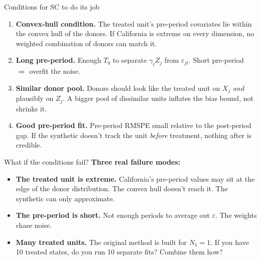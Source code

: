 \documentclass[aspectratio=169,11pt]{beamer}
\begin{document}
\begin{frame}{Conditions for SC to do its job}
\vspace{0.2cm}
\begin{enumerate}\small\setlength\itemsep{1pt}
  \item \textbf{Convex-hull condition.} \;The treated unit's pre-period covariates lie within the convex hull of the donors. \;If California is extreme on every dimension, no weighted combination of donors can match it.
  \vspace{0.2em}
  \item \textbf{Long pre-period.} \;Enough $T_0$ to separate $\gamma_t Z_j$ from $\varepsilon_{jt}$. \;Short pre-period $\Rightarrow$ overfit the noise.
  \vspace{0.2em}
  \item \textbf{Similar donor pool.} \;Donors should look like the treated unit on $X_j$ \textit{and} plausibly on $Z_j$. \;A bigger pool of dissimilar units inflates the bias bound, not shrinks it.
  \vspace{0.2em}
  \item \textbf{Good pre-period fit.} \;Pre-period RMSPE small relative to the post-period gap. \;If the synthetic doesn't track the unit \textit{before} treatment, nothing after is credible.
\end{enumerate}
\end{frame}

\begin{frame}{What if the conditions fail?}
\vspace{0.2cm}
\textbf{Three real failure modes:}
\vspace{0.3em}
\begin{itemize}\small\setlength\itemsep{1pt}
  \item \textbf{The treated unit is extreme.} \;California's pre-period values may sit at the edge of the donor distribution. \;The convex hull doesn't reach it. \;The synthetic can only approximate.
  \vspace{0.2em}
  \item \textbf{The pre-period is short.} \;Not enough periods to average out $\varepsilon$. \;The weights chase noise.
  \vspace{0.2em}
  \item \textbf{Many treated units.} \;The original method is built for $N_1 = 1$. \;If you have 10 treated states, do you run 10 separate fits? \;Combine them how?
\end{itemize}

\vspace{0.4em}

\vspace{0.2em}
\end{frame}
\end{document}
